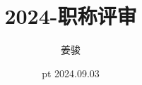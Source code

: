 \title{\textrm{2024}-职称评审}

\author[]{姜\;\;骏\inst{}} %
\date[\today] %
{%
 pt \textrm{2024.09.03}
}


\maketitle
\section*{}

